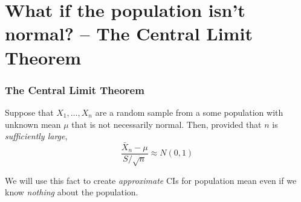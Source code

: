 \section{What if the population isn't normal? -- The Central Limit Theorem}
\begin{frame}
\frametitle{The Central Limit Theorem}
Suppose that $X_1, \hdots, X_n$ are a random sample from a some population with unknown mean $\mu$ that is \alert{not necessarily normal}. 
Then, provided that $n$ is \alert{\emph{sufficiently large}}, 
$$\frac{\bar{X}_n -\mu}{S/\sqrt{n}} \approx N(0,1)$$

We will use this fact to create \emph{approximate} CIs for population mean even if we know \emph{nothing} about the population.
\end{frame}
